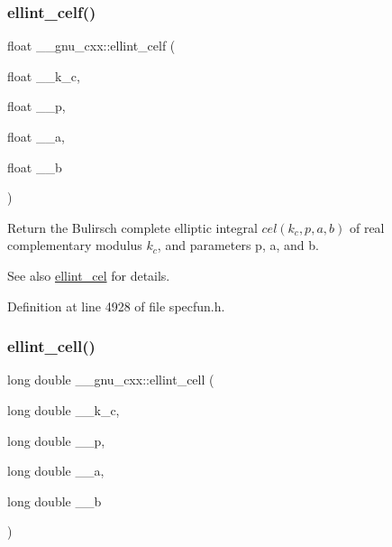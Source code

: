 \subsubsection{\texorpdfstring{ellint\+\_\+celf()}{ellint\_celf()}}
{\footnotesize\ttfamily float \+\_\+\+\_\+gnu\+\_\+cxx\+::ellint\+\_\+celf (\begin{DoxyParamCaption}\item[{float}]{\+\_\+\+\_\+k\+\_\+c,  }\item[{float}]{\+\_\+\+\_\+p,  }\item[{float}]{\+\_\+\+\_\+a,  }\item[{float}]{\+\_\+\+\_\+b }\end{DoxyParamCaption})\hspace{0.3cm}{\ttfamily [inline]}}

Return the Bulirsch complete elliptic integral $ cel(k_c,p,a,b) $ of real complementary modulus $ k_c $, and parameters {\ttfamily p}, {\ttfamily a}, and {\ttfamily b}.

\begin{DoxySeeAlso}{See also}
\hyperlink{group__mathsf__gnu_ga6e44a0d90500e56ef4b3aba6efd7e2b0}{ellint\+\_\+cel} for details. 
\end{DoxySeeAlso}


Definition at line 4928 of file specfun.\+h.

\mbox{\label{group__mathsf__gnu_gaa5add699fb2b4b02e63f8725a3a79750}} 
\subsubsection{\texorpdfstring{ellint\+\_\+cell()}{ellint\_cell()}}
{\footnotesize\ttfamily long double \+\_\+\+\_\+gnu\+\_\+cxx\+::ellint\+\_\+cell (\begin{DoxyParamCaption}\item[{long double}]{\+\_\+\+\_\+k\+\_\+c,  }\item[{long double}]{\+\_\+\+\_\+p,  }\item[{long double}]{\+\_\+\+\_\+a,  }\item[{long double}]{\+\_\+\+\_\+b }\end{DoxyParamCaption})\hspace{0.3cm}{\ttfamily [inline]}}

